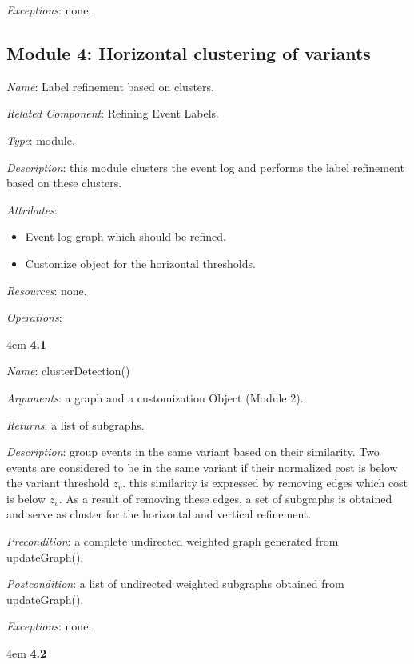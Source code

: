 \documentclass[notitlepage]{article}
\begin{document}
\begin{flushleft}
\textit{Exceptions}: none.
\par
\endgroup


\subsection{Module 4: Horizontal clustering of variants}
\textit{Name}: Label refinement based on clusters.

\textit{Related Component}: Refining Event Labels.

\textit{Type}: module.

\textit{Description}: this module clusters the event log and performs the label refinement based on these clusters.

\textit{Attributes}: \begin{itemize}
	\item Event log graph which should be refined.
	\item Customize object for the horizontal thresholds.
\end{itemize}

\textit{Resources}: none.

\textit{Operations}: 
\medskip

\par
\begingroup
\leftskip4em
\textbf{4.1} 

\textit{Name}: clusterDetection()

\textit{Arguments}: a graph and a customization Object (Module 2).

\textit{Returns}: a list of subgraphs.

\textit{Description}: group events in the same variant based on their similarity. Two events are considered to be in the same variant if their normalized cost is below the variant threshold $z_v$. this similarity is expressed by removing edges which cost is below $z_v$. As a result of removing these edges, a set of subgraphs is obtained and serve as cluster for the horizontal and vertical refinement. 

\textit{Precondition}: a complete undirected weighted graph generated from updateGraph().

\textit{Postcondition}: a list of undirected weighted subgraphs obtained from updateGraph().

\textit{Exceptions}: none.
\par
\endgroup

\medskip

\par
\begingroup
\leftskip4em
\textbf{4.2} 


\end{flushleft}
\end{document}
